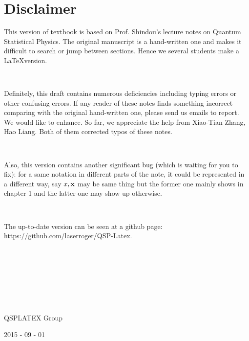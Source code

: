 
\chapter*{Disclaimer}

This version of textbook is based on Prof. Shindou's lecture notes on Quantum Statistical Physics. The original manuscript is a hand-written one and makes it difficult to search or jump between sections. Hence we several students make a \LaTeX version. 

\ 

Definitely, this draft contains numerous deficiencies including typing errors or other confusing errors. If any reader of these notes finds something incorrect comparing with the original hand-written one, please send us emails to report. We would like to enhance. So far, we appreciate the help from Xiao-Tian Zhang, Hao Liang. Both of them corrected typos of these notes. 

\ 

Also, this version contains another significant bug (which is waiting for you to fix): for a same notation in different parts of the note, it could be represented in a different way, say $x, \bf{x}$ may be same thing but the former one mainly shows in chapter 1 and the latter one may show up otherwise. 

\ 

The up-to-date version can be seen at a github page: \url{https://github.com/laserroger/QSP-Latex}. 


\ 

\ 

\ 

\ 

QSPLATEX Group

2015 - 09 - 01

